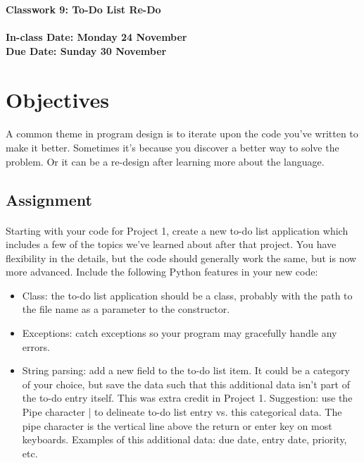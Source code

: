 \documentclass[letter,10pt]{article}
\begin{document}
    
    \huge
    \textbf{Classwork 9: To-Do List Re-Do}
    \normalsize
    \\ ~~ \\
    \textbf{In-class Date: Monday 24 November} \\
    \textbf{Due Date: Sunday 30 November}
    
    \section*{Objectives}
    \paragraph{}A common theme in program design is to iterate upon the code you've written to make it better. Sometimes it's because you discover a better way to solve the problem. Or it can be a re-design after learning more about the language.
    
    \subsection*{Assignment}
    \paragraph{}Starting with your code for Project 1, create a new to-do list application which includes a few of the topics we've learned about after that project. You have flexibility in the details, but the code should generally work the same, but is now more advanced. Include the following Python features in your new code:
    \begin{itemize}
        \item Class: the to-do list application should be a class, probably with the path to the file name as a parameter to the constructor.
        \item Exceptions: catch exceptions so your program may gracefully handle any errors.
        \item String parsing: add a new field to the to-do list item. It could be a category of your choice, but save the data such that this additional data isn't part of the to-do entry itself. This was extra credit in Project 1. Suggestion: use the Pipe character | to delineate to-do list entry vs. this categorical data. The pipe character is the vertical line above the return or enter key on most keyboards. Examples of this additional data: due date, entry date, priority, etc.
    \end{itemize}
    
\end{document}
